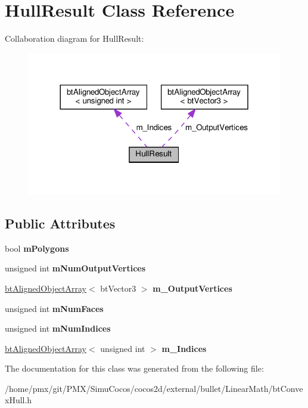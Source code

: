 \hypertarget{classHullResult}{}\section{Hull\+Result Class Reference}
\label{classHullResult}


Collaboration diagram for Hull\+Result\+:
\nopagebreak
\begin{figure}[H]
\begin{center}
\leavevmode
\includegraphics[width=317pt]{classHullResult__coll__graph}
\end{center}
\end{figure}
\subsection*{Public Attributes}
\begin{DoxyCompactItemize}
\item 
\mbox{\label{classHullResult_ac0a9404ad0ba8c0cddf41950684412bc}} 
bool {\bfseries m\+Polygons}
\item 
\mbox{\label{classHullResult_aa31d0601990e10f7a9c0d991dffac859}} 
unsigned int {\bfseries m\+Num\+Output\+Vertices}
\item 
\mbox{\label{classHullResult_a277698a75e064f499b8fe65f43628abd}} 
\hyperlink{classbtAlignedObjectArray}{bt\+Aligned\+Object\+Array}$<$ bt\+Vector3 $>$ {\bfseries m\+\_\+\+Output\+Vertices}
\item 
\mbox{\label{classHullResult_ab20683ae46c0a29c0a0b34fe78474f9a}} 
unsigned int {\bfseries m\+Num\+Faces}
\item 
\mbox{\label{classHullResult_aef8ad7452c3e0eb2c5d4330191e19122}} 
unsigned int {\bfseries m\+Num\+Indices}
\item 
\mbox{\label{classHullResult_a7f4b06eb609d168c8acb51bf71883bd0}} 
\hyperlink{classbtAlignedObjectArray}{bt\+Aligned\+Object\+Array}$<$ unsigned int $>$ {\bfseries m\+\_\+\+Indices}
\end{DoxyCompactItemize}


The documentation for this class was generated from the following file\+:\begin{DoxyCompactItemize}
\item 
/home/pmx/git/\+P\+M\+X/\+Simu\+Cocos/cocos2d/external/bullet/\+Linear\+Math/bt\+Convex\+Hull.\+h\end{DoxyCompactItemize}
